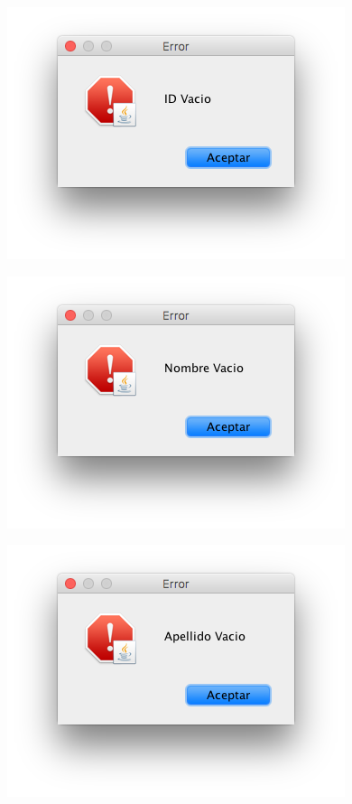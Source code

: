 \documentclass[10pt]{article}
\begin{document}
{\begin{enumerate}
\begin{multicols}{2}
\end{multicols}

\begin{multicols}{3}

\begin{figure}[H]
    \begin{center}
        \includegraphics[scale=.5]{images/02.png}
    \end{center}
\end{figure}

\begin{figure}[H]
    \begin{center}
        \includegraphics[scale=.5]{images/03.png}
    \end{center}
\end{figure}

\begin{figure}[H]
    \begin{center}
        \includegraphics[scale=.5]{images/04.png}
    \end{center}
\end{figure}


\end{multicols}
\end{enumerate}}
\end{document}
